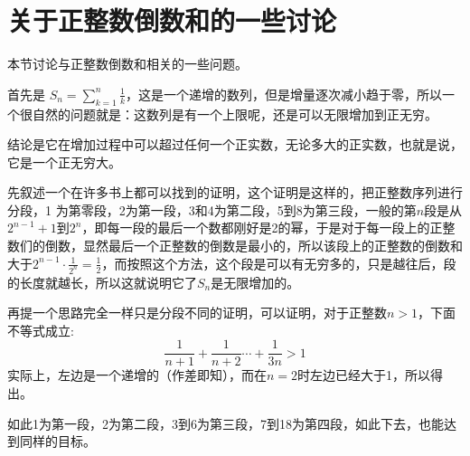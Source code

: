 
\section{关于正整数倒数和的一些讨论}
\label{sec:sum-reciprocal-of-positive-integer}

本节讨论与正整数倒数和相关的一些问题。

首先是 $S_n=\sum_{k=1}^n\frac{1}{k}$，这是一个递增的数列，但是增量逐次减小趋于零，所以一个很自然的问题就是：这数列是有一个上限呢，还是可以无限增加到正无穷。

结论是它在增加过程中可以超过任何一个正实数，无论多大的正实数，也就是说，它是一个正无穷大。

先叙述一个在许多书上都可以找到的证明，这个证明是这样的，把正整数序列进行分段，1 为第零段，2为第一段，3和4为第二段，5到8为第三段，一般的第$n$段是从$2^{n-1}+1$到$2^n$，即每一段的最后一个数都刚好是2的幂，于是对于每一段上的正整数们的倒数，显然最后一个正整数的倒数是最小的，所以该段上的正整数的倒数和大于$2^{n-1}\cdot \frac{1}{2^n}=\frac{1}{2}$，而按照这个方法，这个段是可以有无穷多的，只是越往后，段的长度就越长，所以这就说明它了$S_n$是无限增加的。

再提一个思路完全一样只是分段不同的证明，可以证明，对于正整数$n>1$，下面不等式成立:
\begin{equation*}
  \frac{1}{n+1} + \frac{1}{n+2} \cdots + \frac{1}{3n} > 1
\end{equation*}
实际上，左边是一个递增的（作差即知），而在$n=2$时左边已经大于1，所以得出。

如此1为第一段，2为第二段，3到6为第三段，7到18为第四段，如此下去，也能达到同样的目标。

